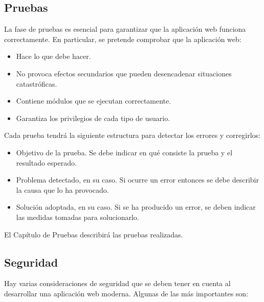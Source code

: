 \subsection{Pruebas}

La fase de pruebas es esencial para garantizar que la aplicación web funciona correctamente. En particular, se pretende comprobar que la aplicación web:
\begin{itemize}
    \item Hace lo que debe hacer.
    \item No provoca efectos secundarios que pueden desencadenar situaciones catastróficas.
    \item Contiene módulos que se ejecutan correctamente.
    \item Garantiza los privilegios de cada tipo de usuario.
\end{itemize}

Cada prueba tendrá la siguiente estructura para detectar los errores y corregirlos:
\begin{itemize}
    \item Objetivo de la prueba. Se debe indicar en qué consiste la prueba y el resultado esperado.
    \item Problema detectado, en su caso. Si ocurre un error entonces se debe describir la causa que lo ha provocado.
    \item Solución adoptada, en su caso. Si se ha producido un error, se deben indicar las medidas tomadas para solucionarlo.
\end{itemize}

El Capítulo de Pruebas describirá las pruebas realizadas.

\subsection{Seguridad}

Hay varias consideraciones de seguridad que se deben tener en cuenta al desarrollar una aplicación web moderna. Algunas de las más importantes son:

